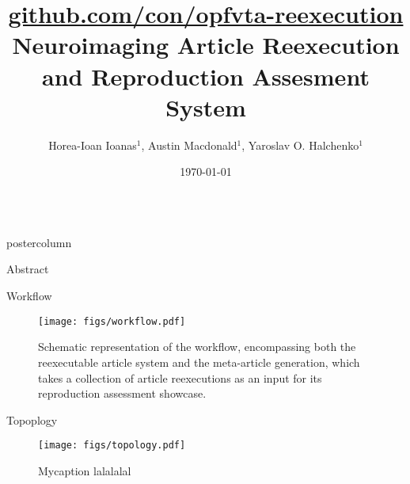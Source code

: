 

\title{
	\href{https://github.com/con/opfvta-reexecution}{
		\Large github.com/con/opfvta-reexecution
	}\\\vspace{.15em}
	Neuroimaging Article Reexecution and Reproduction Assesment System
}
\author{
	Horea-Ioan Ioanas$^{1}$,
	Austin Macdonald$^{1}$,
	Yaroslav O. Halchenko$^{1}$
}
\date{\today}

\newlength{\columnheight}
\setlength{\columnheight}{0.881\textheight}



\begin{frame}
\begin{columns}
	\begin{column}{.42\textwidth}
		\begin{beamercolorbox}[center]{postercolumn}
			\begin{minipage}{.98\textwidth}  %
				\parbox[t][\columnheight]{\textwidth}{ %
					\begin{myblock}{Abstract}
						
					\end{myblock}\vfill
					\vspace{-0.3em}
					\begin{myblock}{Workflow}
						\vspace{0.5em}
						\begin{figure}
							\texttt{[image: figs/workflow.pdf]}
							\caption{
								Schematic representation of the workflow, encompassing both the reexecutable article system and the meta-article generation, which takes a collection of article reexecutions as an input for its reproduction assessment showcase.
							}
						\end{figure}
					\end{myblock}\vfill
					\vspace{-0.3em}
					\begin{myblock}{Topoplogy}
						\vspace{0.5em}
						\begin{figure}
							\captionsetup{width=.9\linewidth}
							\texttt{[image: figs/topology.pdf]}
							\caption{
								Mycaption lalalalal
							}
						\end{figure}

\end{myblock}}
\end{minipage}
\end{beamercolorbox}
\end{column}
\end{columns}
\end{frame}
